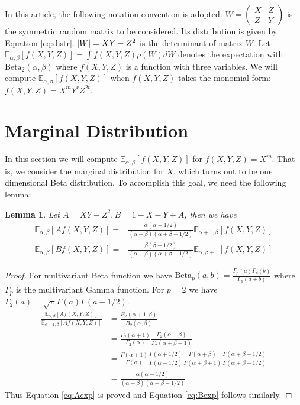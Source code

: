 \documentclass[review,authoryear]{elsarticle}
\DeclarePairedDelimiter\abs{\lvert}{\rvert}
\def\E{\mathbb{E}}
\def\Beta{\textrm{Beta}}
\newtheorem{lemma}{Lemma}
\begin{document}
In this article, the following notation convention is adopted:
$W=\begin{pmatrix} X & Z \\ Z & Y \end{pmatrix}$ is the symmetric random
matrix to be considered. Its distribution is given by Equation \eqref{eq:distr}.
$\abs{W}=XY-Z^2$ is the determinant of matrix $W$.
Let $\E_{\alpha,\beta}[f(X,Y, Z)] = \int f(X,Y,Z)p(W)dW$ denotes the expectation
with $\Beta_2(\alpha, \beta)$ where $f(X, Y, Z)$ is a function with three
variables. We will compute $\E_{\alpha,\beta}[f(X,Y, Z)]$
when $f(X,Y,Z)$ takes the monomial form: $f(X,Y,Z)=X^m Y^r Z^{2t}$.

\section{Marginal Distribution}
In this section we will compute $\E_{\alpha,\beta}[f(X,Y, Z)]$
for $f(X,Y,Z)=X^m$. That is, we consider the marginal distribution for $X$,
which turns out to be one dimensional Beta distribution.
To accomplish this goal, we need the following lemma:
\begin{lemma}\label{lem:AB}
Let $A = XY - Z^2, B = 1 - X - Y + A$, then we have
\begin{align}
\E_{\alpha, \beta}[Af(X,Y,Z)] =&
\frac{\alpha(\alpha-1/2)}{(\alpha+\beta)(\alpha+\beta-1/2)}\E_{\alpha+1, \beta}[f(X,Y,Z)]
\label{eq:Aexp} \\
\E_{\alpha,\beta}[Bf(X,Y,Z)] =&
\frac{\beta(\beta-1/2)}{(\alpha+\beta)(\alpha+\beta-1/2)}\E_{\alpha, \beta+1}[f(X,Y,Z)]
\label{eq:Bexp}
\end{align}
\end{lemma}
\begin{proof}
For multivariant Beta function we have
$\Beta_p(a, b) = \frac{\Gamma_p(a)\Gamma_p(b)}{\Gamma_p(a+b)}$
where $\Gamma_p$ is the multivariant Gamma function.
For $p=2$ we have $\Gamma_2(a) = \sqrt{\pi}\Gamma(a)\Gamma(a-1/2)$.
\begin{align*}
\frac{\E_{\alpha, \beta}[Af(X,Y,Z)]}{\E_{\alpha+1, \beta}[Af(X,Y,Z)]} &
=\frac{B_2(\alpha+1,\beta)}{B_2(\alpha,\beta)}\\
&=\frac{\Gamma_2(\alpha+1)}{\Gamma_2(\alpha)}
\frac{\Gamma_2(\alpha+\beta)}{\Gamma_2(\alpha+\beta+1)}\\
& =\frac{\Gamma(\alpha+1)}{\Gamma(\alpha)}
\frac{\Gamma(\alpha+1/2)}{\Gamma(\alpha-1/2)}
\frac{\Gamma(\alpha+\beta)}{\Gamma(\alpha+\beta+1)}
\frac{\Gamma(\alpha+\beta-1/2)}{\Gamma(\alpha+\beta+1/2)}\\
&=\frac{\alpha(\alpha-1/2)}{(\alpha+\beta)(\alpha+\beta-1/2)}
\end{align*}
Thus Equation \eqref{eq:Aexp} is proved and Equation \eqref{eq:Bexp} follows similarly.
\end{proof}
\end{document}
